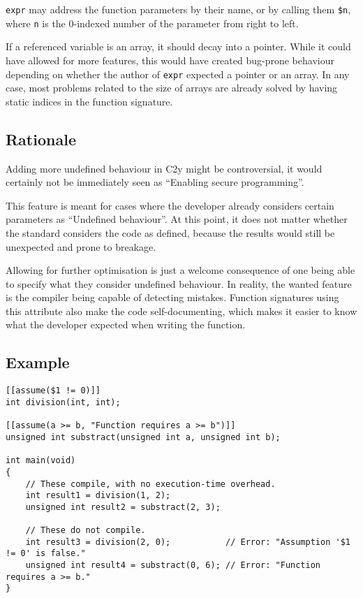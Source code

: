 \documentclass[a4paper, 12pt]{article}
\begin{document}
\texttt{expr} may address the function parameters by their name, or by calling them
\texttt{\$n}, where \texttt{n} is the 0-indexed number of the parameter from right to left.

If a referenced variable is an array, it should decay into a pointer. While it
could have allowed for more features, this would have created bug-prone behaviour
depending on whether the author of \texttt{expr} expected a pointer or an array. In any
case, most problems related to the size of arrays are already solved by having
static indices in the function signature.
\subsection{Rationale}
\label{sec:org602c548}
Adding more undefined behaviour in C2y might be controversial, it would certainly
not be immediately seen as ``Enabling secure programming''.

This feature is meant for cases where the developer already considers certain
parameters as ``Undefined behaviour''. At this point, it does not matter
whether the standard considers the code as defined, because the results would
still be unexpected and prone to breakage.

Allowing for further optimisation is just a welcome consequence of one being able
to specify what they consider undefined behaviour. In reality, the wanted feature is the compiler
being capable of detecting mistakes. Function signatures using this attribute also
make the code self-documenting, which makes it easier to know what the developer expected
when writing the function.
\subsection{Example}
\label{sec:org673fae6}
\begin{verbatim}
[[assume($1 != 0)]]
int division(int, int);

[[assume(a >= b, "Function requires a >= b")]]
unsigned int substract(unsigned int a, unsigned int b);

int main(void)
{
    // These compile, with no execution-time overhead.
    int result1 = division(1, 2);
    unsigned int result2 = substract(2, 3);

    // These do not compile.
    int result3 = division(2, 0);           // Error: "Assumption '$1 != 0' is false."
    unsigned int result4 = substract(0, 6); // Error: "Function requires a >= b."
}
\end{verbatim}
\end{document}
